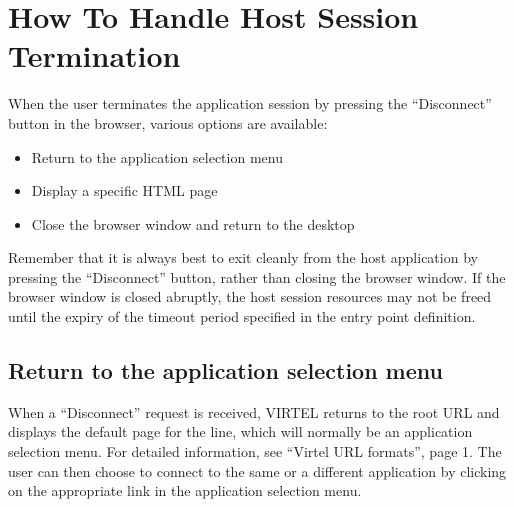 \documentclass[letterpaper,10pt,english]{sphinxmanual}
\begin{document}
\ignorespaces 

\section{How To Handle Host Session Termination}
\label{\detokenize{Customization:how-to-handle-host-session-termination}}\label{\detokenize{Customization:index-68}}
\sphinxAtStartPar
When the user terminates the application session by pressing the “Disconnect” button in the browser, various options are available: \sphinxhyphen{}
\begin{itemize}
\item {} 
\sphinxAtStartPar
Return to the application selection menu

\item {} 
\sphinxAtStartPar
Display a specific HTML page

\item {} 
\sphinxAtStartPar
Close the browser window and return to the desktop

\end{itemize}

\sphinxAtStartPar
Remember that it is always best to exit cleanly from the host application by pressing the “Disconnect” button, rather than closing the browser window. If the browser window is closed abruptly, the host session resources may not be freed until the expiry of the time\sphinxhyphen{}out period specified in the entry point definition.

\ignorespaces 

\subsection{Return to the application selection menu}
\label{\detokenize{Customization:return-to-the-application-selection-menu}}\label{\detokenize{Customization:index-69}}
\sphinxAtStartPar
When a “Disconnect” request is received, VIRTEL returns to the root URL and displays the default page for the line, which will normally be an application selection menu. For detailed information, see “Virtel URL formats”, page 1. The user can then choose to connect to the same or a different application by clicking on the appropriate link in the
application selection menu.
\end{document}
